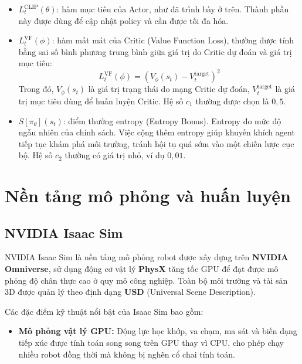 \begin{itemize}
\begin{itemize}[leftmargin=1.5cm]
    \item $L_t^{\text{CLIP}}(\theta)$: hàm mục tiêu của Actor, như đã trình bày
    ở trên. Thành phần này được dùng để cập nhật policy và cần được tối đa hóa.

    \item $L_t^{\text{VF}}(\phi)$: hàm mất mát của Critic (Value Function Loss),
    thường được tính bằng sai số bình phương trung bình giữa giá trị do Critic dự đoán
    và giá trị mục tiêu:
    \begin{equation}
        L_t^{\text{VF}}(\phi)
        =
        \left(
            V_\phi(s_t) - V_t^{\text{target}}
        \right)^2
    \end{equation}
    Trong đó, $V_\phi(s_t)$ là giá trị trạng thái do mạng Critic dự đoán,
    $V_t^{\text{target}}$ là giá trị mục tiêu dùng để huấn luyện Critic.
    Hệ số $c_1$ thường được chọn là $0{,}5$.

    \item $S[\pi_\theta](s_t)$: điểm thưởng entropy (Entropy Bonus). Entropy đo
    mức độ ngẫu nhiên của chính sách. Việc cộng thêm entropy giúp khuyến khích agent
    tiếp tục khám phá môi trường, tránh hội tụ quá sớm vào một chiến lược cục bộ.
    Hệ số $c_2$ thường có giá trị nhỏ, ví dụ $0{,}01$.
\end{itemize}


\section{Nền tảng mô phỏng và huấn luyện}

\subsection{NVIDIA Isaac Sim}

NVIDIA Isaac Sim là nền tảng mô phỏng robot được xây dựng trên
\textbf{NVIDIA Omniverse}, sử dụng động cơ vật lý \textbf{PhysX} tăng tốc GPU
để đạt được mô phỏng độ chân thực cao ở quy mô công nghiệp. Toàn bộ môi trường
và tài sản 3D được quản lý theo định dạng \textbf{USD} (Universal Scene
Description).

Các đặc điểm kỹ thuật nổi bật của Isaac Sim bao gồm:
\begin{itemize}
    \item \textbf{Mô phỏng vật lý GPU:} Động lực học khớp, va chạm, ma sát
    và biến dạng tiếp xúc được tính toán song song trên GPU thay vì CPU,
    cho phép chạy nhiều robot đồng thời mà không bị nghẽn cổ chai tính toán.


\end{itemize}
\end{itemize}
